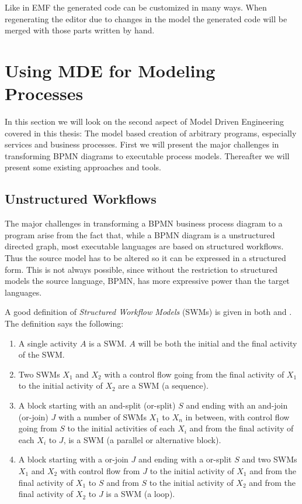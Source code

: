 Like in EMF the generated code can be customized in many ways. When regenerating the editor due to changes in the model the generated code will be merged with those parts written by hand.



\section{Using MDE for Modeling Processes}
\label{sec:mda_process}

In this section we will look on the second aspect of Model Driven Engineering covered in this thesis: The model based creation of arbitrary programs, especially services and business processes. First we will present the major challenges in transforming BPMN diagrams to executable process models. Thereafter we will present some existing approaches and tools.


\subsection{Unstructured Workflows}
\label{sec:mda_mapUSWF}

The major challenges in transforming a BPMN business process diagram to a program arise from the fact that, while a BPMN diagram is a unstructured directed graph, most executable languages are based on structured workflows. Thus the source model has to be altered so it can be expressed in a structured form. This is not always possible, since without the restriction to structured models the source language, BPMN, has more expressive power than the target languages.

A good definition of \emph{Structured Workflow Models} (SWMs) is given in both \cite{strucWFmodeling} and \cite{taxo_unstr_wf}. The definition says the following:

\begin{enumerate}
	\item A single activity $A$ is a SWM. $A$ will be both the initial and the final activity of the SWM.
	
	\item Two SWMs $X_1$ and $X_2$ with a control flow going from the final activity of $X_1$ to the initial activity of $X_2$ are a SWM (a sequence).
	
	\item A block starting with an and-split (or-split) $S$ and ending with an and-join (or-join) $J$ with a number of SWMs $X_1$ to $X_n$ in between, with control flow going from $S$ to the initial activities of each $X_i$ and from the final activity of each $X_i$ to $J$, is a SWM (a parallel or alternative block).
	
	\item A block starting with a or-join $J$ and ending with a or-split $S$ and two SWMs $X_1$ and $X_2$ with control flow from $J$ to the initial activity of $X_1$ and from the final activity of $X_1$ to $S$ and from $S$ to the initial activity of $X_2$ and from the final activity of $X_2$ to $J$ is a SWM (a loop).
\end{enumerate}


